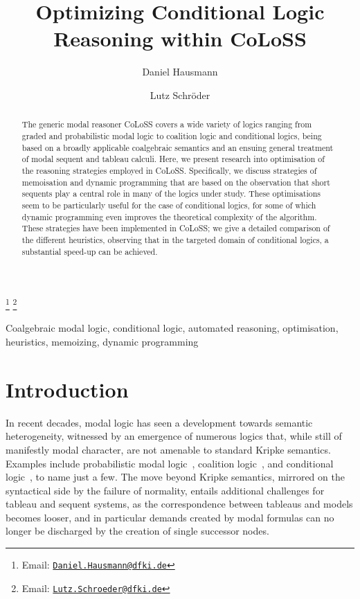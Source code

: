 \documentclass{entcs} \usepackage{entcsmacro}
\newcommand{\COLOSS}{{\textrm CoLoSS}}
\begin{document}
\begin{frontmatter}
  \title{Optimizing Conditional Logic Reasoning within \COLOSS}
  \author[DFKI]{Daniel Hausmann}
  \author[DFKI,UBremen]{Lutz Schr\"oder}
  \address[DFKI]{DFKI Bremen, SKS}
  \address[UBremen]{Department of Mathematics and Computer Science, Universit\"at Bremen, Germany}
  \thanks[myemail]{Email: \href{mailto:Daniel.Hausmann@dfki.de} {\texttt{\normalshape Daniel.Hausmann@dfki.de}}}
  \thanks[coemail]{Email: \href{mailto:Lutz.Schroeder@dfki.de} {\texttt{\normalshape Lutz.Schroeder@dfki.de}}}
\begin{abstract} 
  The generic modal reasoner CoLoSS covers a wide variety of logics
  ranging from graded and probabilistic modal logic to coalition logic
  and conditional logics, being based on a broadly applicable
  coalgebraic semantics and an ensuing general treatment of modal
  sequent and tableau calculi. Here, we present research into
  optimisation of the reasoning strategies employed in
  CoLoSS. Specifically, we discuss strategies of memoisation and
  dynamic programming that are based on the observation that short
  sequents play a central role in many of the logics under
  study. These optimisations seem to be particularly useful for the
  case of conditional logics, for some of which dynamic programming
  even improves the theoretical complexity of the algorithm. These
  strategies have been implemented in CoLoSS; we give a detailed
  comparison of the different heuristics, observing that in the
  targeted domain of conditional logics, a substantial speed-up can be
  achieved.
\end{abstract}
\begin{keyword}
  Coalgebraic modal logic, conditional logic, automated reasoning,
  optimisation, heuristics, memoizing, dynamic programming
\end{keyword}
\end{frontmatter}
\section{Introduction}\label{intro}

In recent decades, modal logic has seen a development towards semantic
heterogeneity, witnessed by an emergence of numerous logics that,
while still of manifestly modal character, are not amenable to
standard Kripke semantics. Examples include probabilistic modal
logic~\cite{FaginHalpern94}, coalition logic~\cite{Pauly02}, and
conditional logic~\cite{Chellas80}, to name just a few. The move
beyond Kripke semantics, mirrored on the syntactical side by the
failure of normality, entails additional challenges for tableau and
sequent systems, as the correspondence between tableaus and models
becomes looser, and in particular demands created by modal formulas
can no longer be discharged by the creation of single successor nodes.
\end{document}
